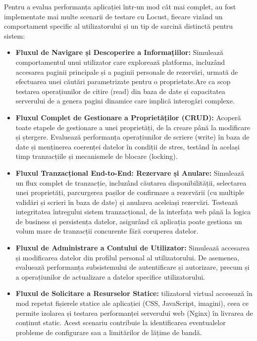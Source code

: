 \documentclass[12pt, a4paper, oneside, romanian]{teza-upb}
\begin{document}
Pentru a evalua performanța aplicației într-un mod cât mai complet, au fost implementate mai multe scenarii de testare cu Locust, fiecare vizând un comportament specific al utilizatorului și un tip de sarcină distinctă pentru sistem:
\begin{itemize}
\item \textbf{Fluxul de Navigare și Descoperire a Informațiilor:}
Simulează comportamentul unui utilizator care explorează platforma, incluzând accesarea paginii principale și a paginii personale de rezervări, urmată de efectuarea unei căutări parametrizate pentru o proprietate.Are ca scop testarea operațiunilor de citire (read) din baza de date și capacitatea serverului de a genera pagini dinamice care implică interogări complexe.
\item \textbf{Fluxul Complet de Gestionare a Proprietăților (CRUD):}  
Acoperă toate etapele de gestionare a unei proprietăți, de la creare până la modificare și ștergere. Evaluează performanța operațiunilor de scriere (write) în baza de date și menținerea coerenței datelor în condiții de stres, testând în același timp tranzacțiile și mecanismele de blocare (locking).  

\item \textbf{Fluxul Tranzacțional End-to-End: Rezervare și Anulare:}  
Simulează un flux complet de tranzacție, incluzând căutarea disponibilității, selectarea unei proprietăți, parcurgerea pașilor de confirmare a rezervării (cu multiple validări și scrieri în baza de date) și anularea aceleiași rezervări. Testează integritatea întregului sistem tranzacțional, de la interfața web până la logica de business și persistența datelor, asigurând că aplicația poate gestiona un volum mare de tranzacții concurente fără coruperea datelor.  

\item \textbf{Fluxul de Administrare a Contului de Utilizator:}  
Simulează accesarea și modificarea datelor din profilul personal al utilizatorului. De asemenea, evaluează performanța subsistemului de autentificare și autorizare, precum și a operațiunilor de actualizare a datelor specifice utilizatorului.  

\item \textbf{Fluxul de Solicitare a Resurselor Statice:}  
tilizatorul virtual accesează în mod repetat fișierele statice ale aplicației (CSS, JavaScript, imagini), ceea ce permite izolarea și testarea performanței serverului web (Nginx) în livrarea de conținut static. Acest scenariu contribuie la identificarea eventualelor probleme de configurare sau a limitărilor de lățime de bandă. 


\end{itemize}
\end{document}

